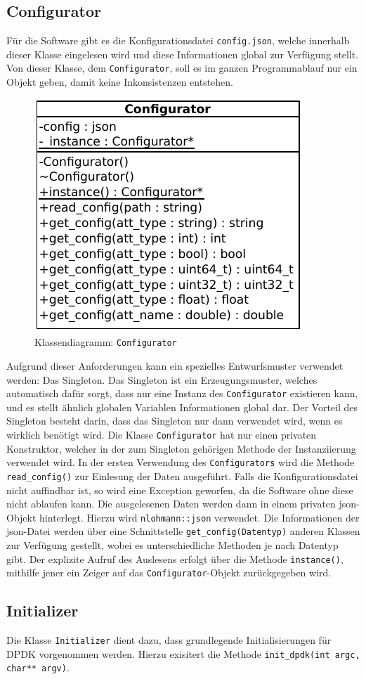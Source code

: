 \documentclass[../review_2.tex]{subfiles}
\begin{document}
\subsection{Configurator}
Für die Software gibt es die Konfigurationsdatei \texttt{config.json}, welche innerhalb dieser Klasse eingelesen wird und diese Informationen global zur Verfügung stellt. Von dieser Klasse, dem \texttt{Configurator}, soll es im ganzen Programmablauf nur ein Objekt geben, damit keine Inkonsistenzen entstehen. 
\begin{figure}[h]
    \centering
    \includegraphics[width=0.4\linewidth]{img/configurator.pdf}
    \caption{Klassendiagramm: \texttt{Configurator}}
    \label{Class_Configurator}
\end{figure}
Aufgrund dieser Anforderungen kann ein spezielles Entwurfsmuster verwendet werden: Das Singleton. Das Singleton ist ein Erzeugungsmuster, welches automatisch dafür sorgt, dass nur eine Instanz des \texttt{Configurator} existieren kann, und es stellt ähnlich globalen Variablen Informationen global dar. Der Vorteil des Singleton besteht darin, dass das Singleton nur dann verwendet wird, wenn es wirklich benötigt wird. Die Klasse \texttt{Configurator} hat nur einen privaten Konstruktor, welcher in der zum Singleton gehörigen Methode der Instanziierung verwendet wird. In der ersten Verwendung des \texttt{Configurators} wird die Methode \texttt{read\_config()} zur Einlesung der Daten ausgeführt. Falls die Konfigurationsdatei nicht auffindbar ist, so wird eine Exception geworfen, da die Software ohne diese nicht ablaufen kann. Die ausgelesenen Daten werden dann in einem privaten json-Objekt hinterlegt. Hierzu wird \texttt{nlohmann::json} verwendet. Die Informationen der json-Datei werden über eine Schnittstelle \texttt{get\_config(Datentyp)} anderen Klassen zur Verfügung gestellt, wobei es unterschiedliche Methoden je nach Datentyp gibt. Der explizite Aufruf des Auslesens erfolgt über die Methode \texttt{instance()}, mithilfe jener ein Zeiger auf das \texttt{Configurator}-Objekt zurückgegeben wird.

\subsection{Initializer}
Die Klasse \texttt{Initializer} dient dazu, dass grundlegende Initialisierungen für DPDK vorgenommen werden. Hierzu exisitert die Methode \texttt{init\_dpdk(int argc, char** argv)}.
\end{document}

